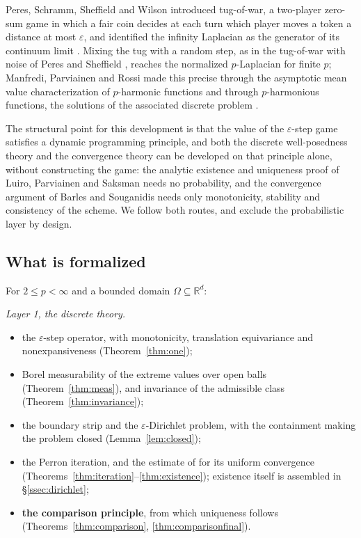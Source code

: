 \documentclass[11pt,reqno]{amsart}
\newcommand{\R}{\mathbb{R}}
\newcommand{\eps}{\varepsilon}
\theoremstyle{plain}
\theoremstyle{definition}
\begin{document}
Peres, Schramm, Sheffield and Wilson introduced tug-of-war, a two-player
zero-sum game in which a fair coin decides at each turn which player moves a
token a distance at most $\eps$, and identified the infinity Laplacian as the
generator of its continuum limit \cite{PSSW09}. Mixing the tug with a random
step, as in the tug-of-war with noise of Peres and Sheffield \cite{PS08},
reaches the normalized $p$-Laplacian for finite $p$; Manfredi, Parviainen and
Rossi made this precise through the asymptotic mean value characterization of
$p$-harmonic functions \cite{MPR10} and through $p$-harmonious functions, the
solutions of the associated discrete problem \cite{MPR12}.

The structural point for this development is that the value of the $\eps$-step game
satisfies a dynamic programming principle, and both the discrete
well-posedness theory and the convergence theory can be developed on that
principle alone, without constructing the game: the analytic existence and
uniqueness proof of Luiro, Parviainen and Saksman \cite{LPS14} needs no
probability, and the convergence argument of Barles and Souganidis \cite{BS91}
needs only monotonicity, stability and consistency of the scheme. We follow
both routes, and exclude the probabilistic layer by design.

\subsection{What is formalized}\label{ssec:scope}

For $2 \le p < \infty$ and a bounded domain $\Omega \subseteq \R^d$:

\emph{Layer 1, the discrete theory.}
\begin{itemize}
  \item the $\eps$-step operator, with monotonicity, translation equivariance
        and nonexpansiveness (Theorem~\ref{thm:one});
  \item Borel measurability of the extreme values over open balls
        (Theorem~\ref{thm:meas}), and invariance of the admissible class
        (Theorem~\ref{thm:invariance});
  \item the boundary strip and the $\eps$-Dirichlet problem, with the
        containment making the problem closed (Lemma~\ref{lem:closed});
  \item the Perron iteration, and the estimate of \cite{LPS14} for its uniform
        convergence (Theorems~\ref{thm:iteration}--\ref{thm:existence});
        existence itself is assembled in \S\ref{ssec:dirichlet};
  \item \textbf{the comparison principle}, from which uniqueness follows
        (Theorems~\ref{thm:comparison}, \ref{thm:comparisonfinal}).
\end{itemize}
\end{document}
